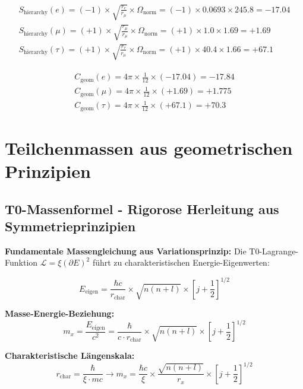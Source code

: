 \documentclass[12pt,a4paper]{article}
\numberwithin{equation}{section}
\newcommand{\xipar}{\xi}
\newcommand{\Cgeom}{C_{\text{geom}}}
\newcommand{\calL}{\mathcal{L}}
\newcommand{\Omegafactor}{\Omega}
\begin{document}
	\begin{align}
		S_{\text{hierarchy}}(e) = (-1) \times \sqrt{\frac{r_e}{r_\mu}} \times \Omegafactor_{\text{norm}} = (-1) \times 0.0693 \times 245.8 = -17.04\\
		S_{\text{hierarchy}}(\mu) = (+1) \times \sqrt{\frac{r_\mu}{r_\mu}} \times \Omegafactor_{\text{norm}} = (+1) \times 1.0 \times 1.69 = +1.69\\
		S_{\text{hierarchy}}(\tau) = (+1) \times \sqrt{\frac{r_\tau}{r_\mu}} \times \Omegafactor_{\text{norm}} = (+1) \times 40.4 \times 1.66 = +67.1
		\label{eq:signature_factors}
	\end{align}
	
	\begin{align}
		\Cgeom(e) = 4\pi \times \frac{1}{12} \times (-17.04) = -17.84\\
		\Cgeom(\mu) = 4\pi \times \frac{1}{12} \times (+1.69) = +1.775\\
		\Cgeom(\tau) = 4\pi \times \frac{1}{12} \times (+67.1) = +70.3
		\label{eq:cgeom_values}
	\end{align}
	
	\section{Teilchenmassen aus geometrischen Prinzipien}
	
	\subsection{T0-Massenformel - Rigorose Herleitung aus Symmetrieprinzipien}
	
	\textbf{Fundamentale Massengleichung aus Variationsprinzip:}
	Die T0-Lagrange-Funktion $\calL = \xipar(\partial E)^2$ führt zu charakteristischen Energie-Eigenwerten:
	
	\begin{equation}
		E_{\text{eigen}} = \frac{\hbar c}{r_{\text{char}}} \times \sqrt{n(n+l)} \times [j+\frac{1}{2}]^{1/2}
		\label{eq:energy_eigenvalues}
	\end{equation}
	
	\textbf{Masse-Energie-Beziehung:}
	\begin{equation}
		m_x = \frac{E_{\text{eigen}}}{c^2} = \frac{\hbar}{c \cdot r_{\text{char}}} \times \sqrt{n(n+l)} \times [j+\frac{1}{2}]^{1/2}
		\label{eq:mass_energy}
	\end{equation}
	
	\textbf{Charakteristische Längenskala:}
	\begin{equation}
		r_{\text{char}} = \frac{\hbar}{\xipar \cdot mc} \rightarrow m_x = \frac{\hbar c}{\xipar} \times \frac{\sqrt{n(n+l)}}{r_x} \times [j+\frac{1}{2}]^{1/2}
		\label{eq:characteristic_length}
	\end{equation}
	
\end{document}
